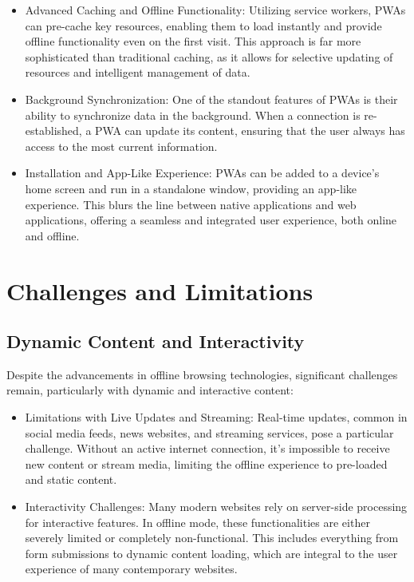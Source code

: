 \documentclass[12pt]{article}
\begin{document}
\begin{itemize}[]
    \item Advanced Caching and Offline Functionality: Utilizing service workers, PWAs can pre-cache key resources, enabling them to load instantly and provide offline functionality even on the first visit. This approach is far more sophisticated than traditional caching, as it allows for selective updating of resources and intelligent management of data.
    \item Background Synchronization: One of the standout features of PWAs is their ability to synchronize data in the background. When a connection is re-established, a PWA can update its content, ensuring that the user always has access to the most current information.
    \item Installation and App-Like Experience: PWAs can be added to a device’s home screen and run in a standalone window, providing an app-like experience. This blurs the line between native applications and web applications, offering a seamless and integrated user experience, both online and offline.
\end{itemize}
 \citep*{PWA}
\section{Challenges and Limitations}

\subsection{Dynamic Content and Interactivity}

Despite the advancements in offline browsing technologies, significant challenges remain, particularly with dynamic and interactive content:

\begin{itemize}[]
    \item Limitations with Live Updates and Streaming: Real-time updates, common in social media feeds, news websites, and streaming services, pose a particular challenge. Without an active internet connection, it’s impossible to receive new content or stream media, limiting the offline experience to pre-loaded and static content.
    \item Interactivity Challenges: Many modern websites rely on server-side processing for interactive features. In offline mode, these functionalities are either severely limited or completely non-functional. This includes everything from form submissions to dynamic content loading, which are integral to the user experience of many contemporary websites.
\end{itemize}
\end{document}
